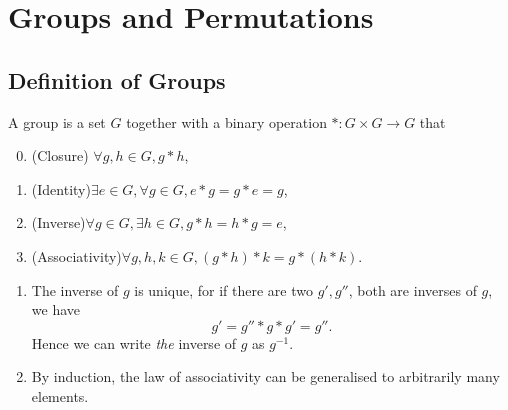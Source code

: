 \documentclass[a4paper]{article}
\begin{document}
	\maketitle
    \tableofcontents

	\section{Groups and Permutations}

    \subsection{Definition of Groups}
    \begin{definition}[Group]
        A group is a set $G$ together with a binary operation $ \ast: G\times G \to G $ that 
        \begin{enumerate}[({G}1)]
            \setcounter{enumi}{-1}
            \item (Closure) $ \forall g,h\in G, g\ast h $,
            \item (Identity)$ \exists e\in G, \forall g\in G, e*g = g*e = g $,
            \item (Inverse)$ \forall g\in G, \exists h\in G, g * h = h*g = e $,
            \item (Associativity)$ \forall g,h,k\in G, (g*h)*k = g*(h*k) $. 
        \end{enumerate}
    \end{definition}
    \begin{remark}
        \begin{enumerate}[(1)]
            \item         The inverse of $g$ is unique, for if there are two $g',g''$, both are inverses of $g$, we have 
            \[
                g' = g''*g*g' = g''
            .\]
            Hence we can write \textit{the} inverse of $g$ as $ g^{-1} $.
            \item By induction, the law of associativity can be generalised to arbitrarily many elements.
        \end{enumerate}
    \end{remark}
\end{document}

